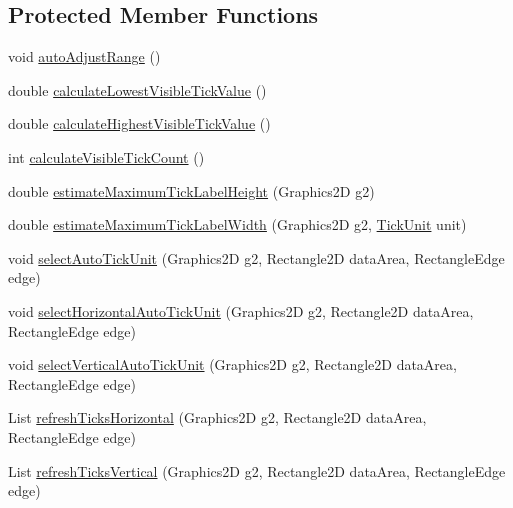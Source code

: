 \subsection*{Protected Member Functions}
\begin{DoxyCompactItemize}
\item 
void \mbox{\hyperlink{classorg_1_1jfree_1_1chart_1_1axis_1_1_number_axis_aba992cef0c92cebf273e2ca87dcebea4}{auto\+Adjust\+Range}} ()
\item 
double \mbox{\hyperlink{classorg_1_1jfree_1_1chart_1_1axis_1_1_number_axis_a37ee8601a1f1f9eeb50edf7c7d49443f}{calculate\+Lowest\+Visible\+Tick\+Value}} ()
\item 
double \mbox{\hyperlink{classorg_1_1jfree_1_1chart_1_1axis_1_1_number_axis_a0289af2e8c0ee3949cd3e833b2566239}{calculate\+Highest\+Visible\+Tick\+Value}} ()
\item 
int \mbox{\hyperlink{classorg_1_1jfree_1_1chart_1_1axis_1_1_number_axis_aa4f2d1208143bd71e100afddf0a96c78}{calculate\+Visible\+Tick\+Count}} ()
\item 
double \mbox{\hyperlink{classorg_1_1jfree_1_1chart_1_1axis_1_1_number_axis_ab51158a20f51dfc3883d22589aee6ba1}{estimate\+Maximum\+Tick\+Label\+Height}} (Graphics2D g2)
\item 
double \mbox{\hyperlink{classorg_1_1jfree_1_1chart_1_1axis_1_1_number_axis_af9f08a86a5c23b4926d336856846ee2e}{estimate\+Maximum\+Tick\+Label\+Width}} (Graphics2D g2, \mbox{\hyperlink{classorg_1_1jfree_1_1chart_1_1axis_1_1_tick_unit}{Tick\+Unit}} unit)
\item 
void \mbox{\hyperlink{classorg_1_1jfree_1_1chart_1_1axis_1_1_number_axis_a1805073be4bbf13ae8e2bcca10a1aaea}{select\+Auto\+Tick\+Unit}} (Graphics2D g2, Rectangle2D data\+Area, Rectangle\+Edge edge)
\item 
void \mbox{\hyperlink{classorg_1_1jfree_1_1chart_1_1axis_1_1_number_axis_a8f05004b5ecd603db316b12502be0ba2}{select\+Horizontal\+Auto\+Tick\+Unit}} (Graphics2D g2, Rectangle2D data\+Area, Rectangle\+Edge edge)
\item 
void \mbox{\hyperlink{classorg_1_1jfree_1_1chart_1_1axis_1_1_number_axis_abf9d6c8c66d8ba8c81f0cb3d3b9c260d}{select\+Vertical\+Auto\+Tick\+Unit}} (Graphics2D g2, Rectangle2D data\+Area, Rectangle\+Edge edge)
\item 
List \mbox{\hyperlink{classorg_1_1jfree_1_1chart_1_1axis_1_1_number_axis_aa554ab4a034b5157dc978d685d548897}{refresh\+Ticks\+Horizontal}} (Graphics2D g2, Rectangle2D data\+Area, Rectangle\+Edge edge)
\item 
List \mbox{\hyperlink{classorg_1_1jfree_1_1chart_1_1axis_1_1_number_axis_acb42d5501507f1d1bb8313a0ad58dc0e}{refresh\+Ticks\+Vertical}} (Graphics2D g2, Rectangle2D data\+Area, Rectangle\+Edge edge)
\end{DoxyCompactItemize}


